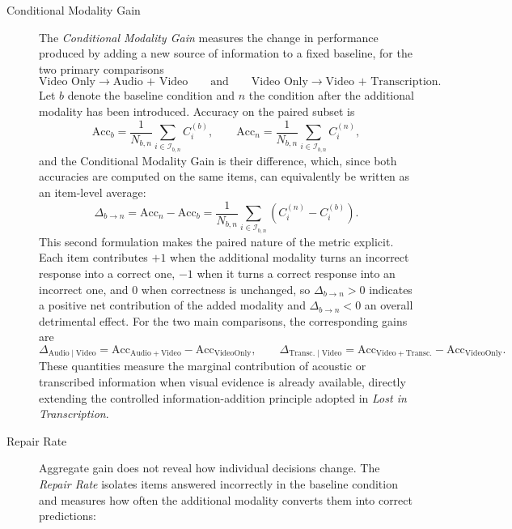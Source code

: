 \begin{description}
\item[Conditional Modality Gain]
 The \textit{Conditional Modality Gain} measures the change in performance produced by adding a new source of information to a fixed baseline, for the two primary comparisons
\begin{equation}
\text{Video Only}
\rightarrow
\text{Audio + Video}
\qquad \text{and} \qquad
\text{Video Only}
\rightarrow
\text{Video + Transcription}.
\end{equation}
Let \(b\) denote the baseline condition and \(n\) the condition after the additional modality has been introduced. Accuracy on the paired subset is
\begin{equation}
\mathrm{Acc}_{b}
=
\frac{1}{N_{b,n}}
\sum_{i \in \mathcal{I}_{b,n}}
C_i^{(b)},
\qquad
\mathrm{Acc}_{n}
=
\frac{1}{N_{b,n}}
\sum_{i \in \mathcal{I}_{b,n}}
C_i^{(n)},
\end{equation}
and the Conditional Modality Gain is their difference, which, since both accuracies are computed on the same items, can equivalently be written as an item-level average:
\begin{equation}
\Delta_{b \rightarrow n}
=
\mathrm{Acc}_{n}
-
\mathrm{Acc}_{b}
=
\frac{1}{N_{b,n}}
\sum_{i \in \mathcal{I}_{b,n}}
\left(
C_i^{(n)}
-
C_i^{(b)}
\right).
\end{equation}
This second formulation makes the paired nature of the metric explicit. Each item contributes \(+1\) when the additional modality turns an incorrect response into a correct one, \(-1\) when it turns a correct response into an incorrect one, and \(0\) when correctness is unchanged, so \(\Delta_{b \rightarrow n} > 0\) indicates a positive net contribution of the added modality and \(\Delta_{b \rightarrow n} < 0\) an overall detrimental effect.
For the two main comparisons, the corresponding gains are
\begin{equation}
\Delta_{\mathrm{Audio}\mid\mathrm{Video}}
=
\mathrm{Acc}_{\mathrm{Audio+Video}}
-
\mathrm{Acc}_{\mathrm{VideoOnly}},
\qquad
\Delta_{\mathrm{Transc.}\mid\mathrm{Video}}
=
\mathrm{Acc}_{\mathrm{Video+Transc.}}
-
\mathrm{Acc}_{\mathrm{VideoOnly}}.
\end{equation}
These quantities measure the marginal contribution of acoustic or transcribed information when visual evidence is already available, directly extending the controlled information-addition principle adopted in \textit{Lost in Transcription}.
\item[Repair Rate] Aggregate gain does not reveal how individual decisions change. The \textit{Repair Rate} isolates items answered incorrectly in the baseline condition and measures how often the additional modality converts them into correct predictions:

\end{description}
